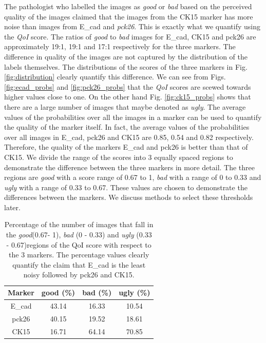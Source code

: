 The pathologist who labelled the images as \textit{good} or \textit{bad} based on the perceived quality of the images claimed that the images from the CK15 marker has more noise than images from E\_cad and \textit{pck26}. This is exactly what we quantify using the \textit{QoI} score. The ratios of \textit{good} to \textit{bad} images for E\_cad, CK15 and pck26 are approximately 19:1, 19:1 and 17:1 respectively for the three markers. The difference in quality of the images are not captured by the distribution of the labels themselves. The distributions of the scores of the three markers in Fig. \ref{fig:distribution} clearly quantify this difference. We can see from Figs. \ref{fig:ecad_probs} and \ref{fig:pck26_probs} that the \textit{QoI} scores are scewed towards higher values close to one. On the other hand Fig. \ref{fig:ck15_probs} shows that there are a large number of images that maybe denoted as \textit{ugly}. The average values of the probabilities over all the images in a marker can be used to quantify the quality of the marker itself. In fact, the average values of the probabilities over all images in E\_cad, pck26 and CK15 are 0.85, 0.54 and 0.82 respectively.  Therefore, the quality of the markers E\_cad and pck26 is better than that of CK15. We divide the range of the scores into 3 equally spaced regions to demonstrate the difference between the three markers in more detail. The three regions are \textit{good} with a score range of 0.67 to 1, \textit{bad} with a range of 0 to 0.33 and \textit{ugly} with a range of 0.33 to 0.67. These values are chosen to demonstrate the differences between the markers. We discuss methods to select these thresholds later.

\begin{table}[ht!]
\centering
\caption{Percentage of the number of images that fall in the \textit{good}(0.67- 1), \textit{bad} (0 - 0.33) and \textit{ugly} (0.33 - 0.67)regions of the QoI score with respect to the 3 markers. The percentage values clearly quantify the claim that E\_cad is the least noisy followed by pck26 and CK15.}
\begin{tabular}{ |c|c|c|c|} 
 \hline
\textbf{Marker} & \textbf{good} (\%)& \textbf{bad} (\%) & \textbf{ugly} (\%)\\ 
 \hline
E\_cad & 43.14 & 16.33 & 10.54\\
 \hline
pck26 & 40.15 & 19.52 & 18.61\\
 \hline
CK15 & 16.71 & 64.14 & 70.85\\
 \hline
 \end{tabular}
\label{table:scores}
\end{table}



